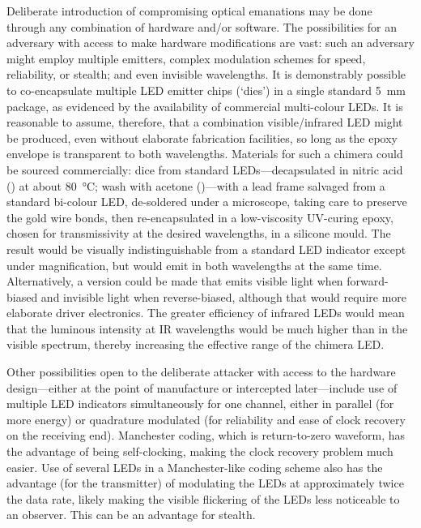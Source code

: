 \documentclass[a4paper,twoside,11pt,openany]{book}
\begin{document}
Deliberate introduction of compromising optical emanations may be done through
any combination of hardware and/or software. The possibilities for an adversary
with access to make hardware modifications are vast: such an adversary might
employ multiple emitters, complex modulation schemes for speed, reliability, or
stealth; and even invisible wavelengths. It is demonstrably possible to
co-encapsulate multiple LED emitter chips (`dies') in a single standard
\SI{5}{\milli\metre} package, as evidenced by the availability of commercial
multi-colour LEDs. It is reasonable to assume, therefore, that a combination
visible/infrared LED might be produced, even without elaborate fabrication
facilities, so long as the epoxy envelope is transparent to both wavelengths.
Materials for such a chimera could be sourced commercially: dice from standard
LEDs---decapsulated in nitric acid () at about \SI{80}{\celsius}; wash
with acetone ()---with a lead frame salvaged from a standard
bi-colour LED,
de-soldered under a microscope, taking care to preserve the gold wire bonds,
then re-encapsulated in a low-viscosity UV-curing epoxy, chosen for
transmissivity at the desired wavelengths, in a silicone mould. The result
would be visually indistinguishable from a standard LED indicator except under
magnification, but would emit in both wavelengths at the same time.
Alternatively, a version could be made that emits visible light when
forward-biased and invisible light when reverse-biased, although that would
require more elaborate driver electronics. The greater efficiency of infrared
LEDs would mean that the luminous intensity at IR wavelengths would be much
higher than in the visible spectrum, thereby increasing the effective range of
the chimera LED.

Other possibilities open to the deliberate attacker with access to the hardware
design---either at the point of manufacture or intercepted later---include use
of multiple LED indicators simultaneously for one channel, either in parallel
(for more energy) or quadrature modulated (for reliability and ease of clock
recovery on the receiving end). Manchester coding, which is return-to-zero
waveform, has the advantage of being self-clocking, making the clock recovery
problem much easier. Use of several LEDs in a Manchester-like coding scheme
also has the advantage (for the transmitter) of modulating the LEDs at
approximately twice the data rate, likely making the visible flickering of the
LEDs less noticeable to an observer. This can be an advantage for stealth.
\end{document}
